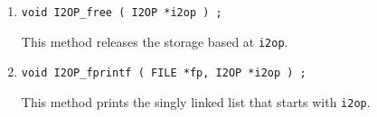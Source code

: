 \begin{enumerate}
\item
\begin{verbatim}
void I2OP_free ( I2OP *i2op ) ;
\end{verbatim}
This method releases the storage based at {\tt *i2op}.
\item
\begin{verbatim}
void I2OP_fprintf ( FILE *fp, I2OP *i2op ) ;
\end{verbatim}
This method prints the singly linked list that starts with {\tt i2op}.
\end{enumerate}
